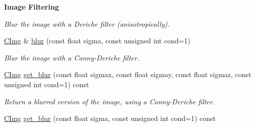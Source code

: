 \begin{Indent}{\bf Image Filtering}
\begin{DoxyCompactItemize}
\begin{DoxyCompactList}\small\item\em Blur the image with a Deriche filter (anisotropically). \item\end{DoxyCompactList}\item 
\hyperlink{structcimg__library_1_1_c_img}{CImg} \& \hyperlink{structcimg__library_1_1_c_img_a02ba0d7847585e04ac727d404005adc7}{blur} (const float sigma, const unsigned int cond=1)
\begin{DoxyCompactList}\small\item\em Blur the image with a Canny-\/Deriche filter. \item\end{DoxyCompactList}\item 
\hyperlink{structcimg__library_1_1_c_img}{CImg} \hyperlink{structcimg__library_1_1_c_img_a5e27225b895209e2cf72b068e8008bad}{get\_\-blur} (const float sigmax, const float sigmay, const float sigmaz, const unsigned int cond=1) const 
\begin{DoxyCompactList}\small\item\em Return a blurred version of the image, using a Canny-\/Deriche filter. \item\end{DoxyCompactList}\item 
\hypertarget{structcimg__library_1_1_c_img_a25c5a6d6345ad5224efc3942df21913e}{
\hyperlink{structcimg__library_1_1_c_img}{CImg} \hyperlink{structcimg__library_1_1_c_img_a25c5a6d6345ad5224efc3942df21913e}{get\_\-blur} (const float sigma, const unsigned int cond=1) const }
\label{structcimg__library_1_1_c_img_a25c5a6d6345ad5224efc3942df21913e}


\end{DoxyCompactItemize}
\end{Indent}

